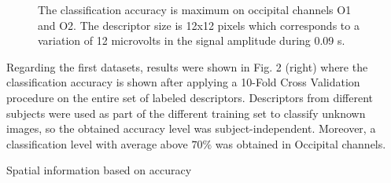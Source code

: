    
\begin{figure}[h!]
\centering
{}
\caption[Alpha Waves Classification]{The classification accuracy is maximum on occipital channels O1 and O2. The descriptor size is 12x12 pixels which corresponds to a variation of 12 microvolts in the signal amplitude during 0.09 s.}
\label{fig:alpharesults}
\end{figure}
   
Regarding the first datasets, results were shown in Fig. 2 (right) where the classification accuracy is shown after applying a 10-Fold Cross Validation procedure on the entire set of labeled descriptors.  Descriptors from different subjects were used as part of the different training set to classify unknown images, so the obtained accuracy level was subject-independent.  Moreover, a classification level with average above $70\%$ was obtained in Occipital channels.


Spatial information based on accuracy

